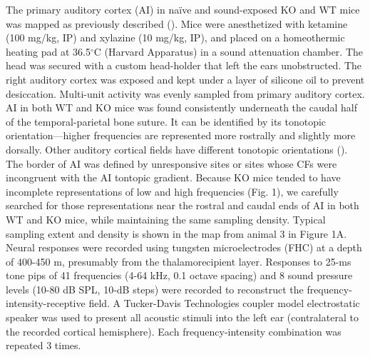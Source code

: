 The primary auditory cortex (AI) in na\"ive and sound-exposed KO and WT mice was mapped as previously described (\cite{Kim2009}). Mice were anesthetized with ketamine (100 mg/kg, IP) and xylazine (10 mg/kg, IP), and placed on a homeothermic heating pad at 36.5$^\circ$C (Harvard Apparatus) in a sound attenuation chamber. The head was secured with a custom head-holder that left the ears unobstructed. The right auditory cortex was exposed and kept under a layer of silicone oil to prevent desiccation. Multi-unit activity was evenly sampled from primary auditory cortex. AI in both WT and KO mice was found consistently underneath the caudal half of the temporal-parietal bone suture. It can be identified by its tonotopic orientation---higher frequencies are represented more rostrally and slightly more dorsally. Other auditory cortical fields have different tonotopic orientations (\cite{Guo2012}). The border of AI was defined by unresponsive sites or sites whose CFs were incongruent with the AI tontopic gradient. Because KO mice tended to have incomplete representations of low and high frequencies (Fig. 1), we carefully searched for those representations near the rostral and caudal ends of AI in both WT and KO mice, while maintaining the same sampling density. Typical sampling extent and density is shown in the map from animal 3 in Figure 1A. Neural responses were recorded using tungsten microelectrodes (FHC) at a depth of 400-450 \textmu m, presumably from the thalamorecipient layer. Responses to 25-ms tone pips of 41 frequencies (4-64 kHz, 0.1 octave spacing) and 8 sound pressure levels (10-80 dB SPL, 10-dB steps) were recorded to reconstruct the frequency-intensity-receptive field. A Tucker-Davis Technologies coupler model electrostatic speaker was used to present all acoustic stimuli into the left ear (contralateral to the recorded cortical hemisphere). Each frequency-intensity combination was repeated 3 times.

